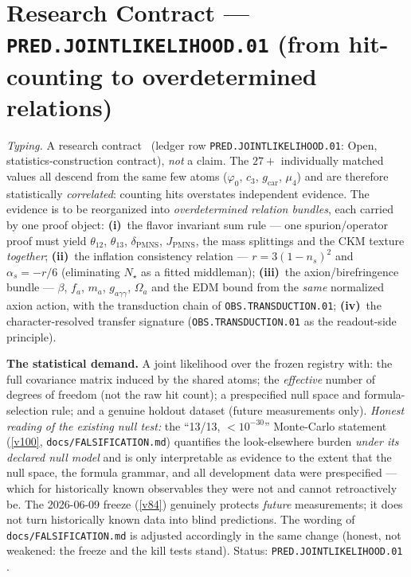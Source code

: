 \section*{Research Contract --- \texttt{PRED.JOINTLIKELIHOOD.01} (from hit-counting to overdetermined relations)}
\noindent\emph{Typing.} A research contract \mO\ (ledger row \texttt{PRED.JOINTLIKELIHOOD.01}:
Open, statistics-construction contract), \emph{not} a claim.  The $27{+}$ individually matched
values all descend from the same few atoms ($\varphi_0$, $c_3$, $g_{\mathrm{car}}$, $\mu_4$) and
are therefore statistically \emph{correlated}: counting hits overstates independent evidence.
The evidence is to be reorganized into \emph{overdetermined relation bundles}, each carried by
one proof object:
\textbf{(i)}~the flavor invariant sum rule --- one spurion/operator proof must yield
$\theta_{12}$, $\theta_{13}$, $\delta_{\mathrm{PMNS}}$, $J_{\mathrm{PMNS}}$, the mass splittings
and the CKM texture \emph{together};
\textbf{(ii)}~the inflation consistency relation --- $r=3(1-n_s)^2$ and $\alpha_s=-r/6$
(eliminating $N_\star$ as a fitted middleman);
\textbf{(iii)}~the axion/birefringence bundle --- $\beta$, $f_a$, $m_a$, $g_{a\gamma\gamma}$,
$\Omega_a$ and the EDM bound from the \emph{same} normalized axion action, with the transduction
chain of \texttt{OBS.TRANSDUCTION.01};
\textbf{(iv)}~the character-resolved transfer signature (\texttt{OBS.TRANSDUCTION.01} as the
readout-side principle).

\par\smallskip\noindent\textbf{The statistical demand.}  A joint likelihood over the frozen
registry with: the full covariance matrix induced by the shared atoms; the \emph{effective}
number of degrees of freedom (not the raw hit count); a prespecified null space and
formula-selection rule; and a genuine holdout dataset (future measurements only).  \emph{Honest
reading of the existing null test:} the ``13/13, $<10^{-30}$'' Monte-Carlo statement (\vref{v100},
\texttt{docs/FALSIFICATION.md}) quantifies the look-elsewhere burden \emph{under its declared
null model} and is only interpretable as evidence to the extent that the null space, the formula
grammar, and all development data were prespecified --- which for historically known observables
they were not and cannot retroactively be.  The 2026-06-09 freeze (\vref{v84}) genuinely
protects \emph{future} measurements; it does not turn historically known data into blind
predictions.  The wording of \texttt{docs/FALSIFICATION.md} is adjusted accordingly in the same
change (honest, not weakened: the freeze and the kill tests stand).  Status:
\texttt{PRED.JOINTLIKELIHOOD.01} \mO.

